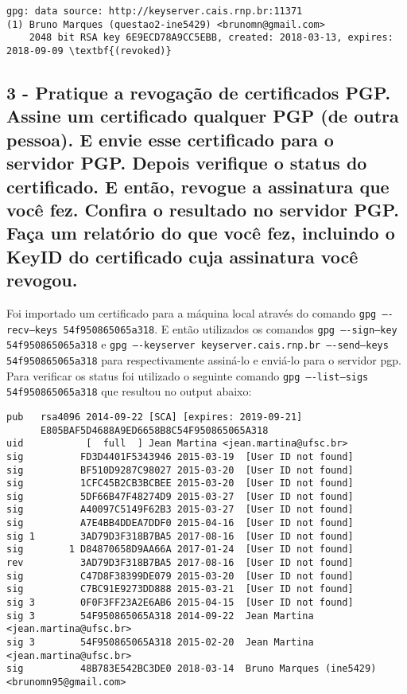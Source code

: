 \documentclass[
    article,            %
    11pt,               %
    oneside,            %
    a4paper,            %
    english,            %
    brazil,             %
    sumario=tradicional,
    ]{abntex2}
\begin{document}
\begin{Verbatim}[frame=single, commandchars=\\\{\}, fontsize=\footnotesize]
gpg: data source: http://keyserver.cais.rnp.br:11371
(1) Bruno Marques (questao2-ine5429) <brunomn@gmail.com>
    2048 bit RSA key 6E9ECD78A9CC5EBB, created: 2018-03-13, expires: 2018-09-09 \textbf{(revoked)}
\end{Verbatim}



\subsection*{\textbf{3 - Pratique a revogação de certificados PGP. Assine um certificado qualquer PGP (de outra pessoa). E envie esse certificado para o servidor PGP. Depois verifique o status do certificado. E então, revogue a assinatura que você fez. Confira o resultado no servidor PGP. Faça um relatório do que você fez, incluindo o KeyID do certificado cuja assinatura você revogou.}}

Foi importado um certificado para a máquina local através do comando \texttt{gpg ----recv--keys 54f950865065a318}. E então utilizados os comandos \texttt{gpg ----sign--key 54f950865065a318} e \texttt{gpg ----keyserver keyserver.cais.rnp.br ----send--keys 54f950865065a318} para respectivamente assiná-lo e enviá-lo para o servidor pgp. Para verificar os status foi utilizado o seguinte comando \texttt{gpg ----list--sigs 54f950865065a318} que resultou no output abaixo:

\begin{Verbatim}[frame=single, commandchars=\\\{\}, fontsize=\footnotesize]
pub   rsa4096 2014-09-22 [SCA] [expires: 2019-09-21]
      E805BAF5D4688A9ED6658B8C54F950865065A318
uid           [  full  ] Jean Martina <jean.martina@ufsc.br>
sig          FD3D4401F5343946 2015-03-19  [User ID not found]
sig          BF510D9287C98027 2015-03-20  [User ID not found]
sig          1CFC45B2CB3BCBEE 2015-03-20  [User ID not found]
sig          5DF66B47F48274D9 2015-03-27  [User ID not found]
sig          A40097C5149F62B3 2015-03-27  [User ID not found]
sig          A7E4BB4DDEA7DDF0 2015-04-16  [User ID not found]
sig 1        3AD79D3F318B7BA5 2017-08-16  [User ID not found]
sig        1 D84870658D9AA66A 2017-01-24  [User ID not found]
rev          3AD79D3F318B7BA5 2017-08-16  [User ID not found]
sig          C47D8F38399DE079 2015-03-20  [User ID not found]
sig          C7BC91E9273DD888 2015-03-21  [User ID not found]
sig 3        0F0F3FF23A2E6AB6 2015-04-15  [User ID not found]
sig 3        54F950865065A318 2014-09-22  Jean Martina <jean.martina@ufsc.br>
sig 3        54F950865065A318 2015-02-20  Jean Martina <jean.martina@ufsc.br>
sig          48B783E542BC3DE0 2018-03-14  Bruno Marques (ine5429) <brunomn95@gmail.com>
\end{Verbatim}
\end{document}
